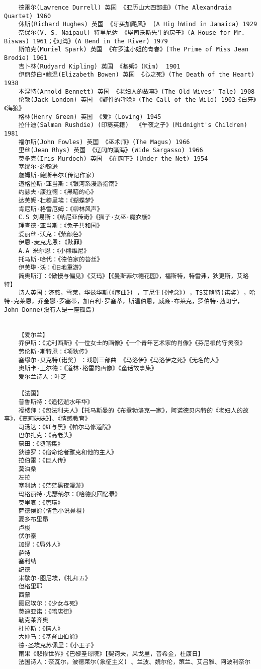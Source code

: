\documentclass[UTF8]{../RepresentationUniverse}
\begin{document}
\begin{lstlisting}
    德雷尔(Lawrence Durrell) 英国 《亚历山大四部曲》(The Alexandraia Quartet) 1960
    休斯(Richard Hughes) 英国 《牙买加飓风》 (A Hig hWind in Jamaica) 1929
    奈保尔(V. S. Naipaul) 特里尼达 《毕司沃斯先生的房子》(A House for Mr. Biswas) 1961；《河湾》(A Bend in the River) 1979
    斯帕克(Muriel Spark) 英国 《布罗迪小姐的青春》(The Prime of Miss Jean Brodie) 1961
    吉卜林(Rudyard Kipling) 英国 《基姆》(Kim)  1901
    伊丽莎白•鲍温(Elizabeth Bowen) 英国 《心之死》(The Death of the Heart) 1938
    本涅特(Arnold Bennett) 英国 《老妇人的故事》(The Old Wives' Tale) 1908
    伦敦(Jack London) 英国 《野性的呼唤》(The Call of the Wild) 1903《白牙》《海狼》
    格林(Henry Green) 英国 《爱》(Loving) 1945
    拉什迪(Salman Rushdie) (印裔英籍)  《午夜之子》(Midnight's Children) 1981
    福尔斯(John Fowles) 英国 《巫术师》(The Magus) 1966
    里丝(Jean Rhys) 英国 《辽阔的藻海》(Wide Sargasso) 1966
    莫多克(Iris Murdoch) 英国 《在网下》(Under the Net) 1954
    塞缪尔·约翰逊
    詹姆斯·鲍斯韦尔(传记作家) 
    道格拉斯·亚当斯：《银河系漫游指南》
    约瑟夫·康拉德：《黑暗的心》
    达芙妮·杜穆里埃：《蝴蝶梦》
    肯尼斯·格雷厄姆：《柳林风声》
    C.S 刘易斯：《纳尼亚传奇》《狮子·女巫·魔衣橱》
    理查德·亚当斯：《兔子共和国》
    爱丽丝·沃克：《紫颜色》
    伊恩·麦克尤恩:《赎罪》
    A.A 米尔恩：《小熊维尼》
    托马斯·哈代：《德伯家的苔丝》
    伊芙琳·沃：《旧地重游》
    简奥斯汀：《傲慢与偏见》《艾玛》【《曼斯菲尔德花园》，福斯特，特雷弗，狄更斯，艾略特】
    诗人英国：济慈，雪莱，华兹华斯(《序曲》) ，丁尼生(《悼念》) ，TS艾略特(诺奖) ，哈特·克莱恩，乔金娜·罗塞蒂，加百利·罗塞蒂，斯温伯恩，威廉·布莱克，罗伯特·勃朗宁，John Donne(没有人是一座孤岛) 
    
    
    【爱尔兰】
    乔伊斯：《尤利西斯》《一位女士的画像》《一个青年艺术家的肖像》《芬尼根的守灵夜》
    劳伦斯·斯特恩：《项狄传》
    塞缪尔·贝克特(诺奖) ：戏剧三部曲 《马洛伊》《马洛伊之死》《无名的人》
    奥斯卡·王尔德：《道林·格雷的画像》《童话故事集》
    爱尔兰诗人：叶芝

    【法国】
    普鲁斯特：《追忆逝水年华》
    福楼拜：《包法利夫人》【托马斯曼的《布登勃洛克一家》，阿诺德贝内特的《老妇人的故事》，《嘉莉妹妹》】、《情感教育》
    司汤达：《红与黑》《帕尔马修道院》
    巴尔扎克：《高老头》
    蒙田：《随笔集》
    狄德罗：《宿命论者雅克和他的主人》
    拉伯雷：《巨人传》
    莫泊桑
    左拉
    塞利纳：《茫茫黑夜漫游》
    玛格丽特·尤瑟纳尔：《哈德良回忆录》
    莫里哀：《唐璜》
    萨德侯爵(情色小说鼻祖) 
    夏多布里昂
    卢梭
    伏尔泰
    加缪：《局外人》
    萨特
    塞利纳
    纪德
    米歇尔·图尼埃，《礼拜五》
    但格里耶
    西蒙
    图尼埃尔：《少女与死》
    莫迪亚诺：《暗店街》
    勒克莱齐奥
    杜拉斯：《情人》
    大仲马：《基督山伯爵》
    德·圣埃克苏佩里：《小王子》
    雨果《悲惨世界》《巴黎圣母院》【契诃夫，果戈里，普希金，杜康日】
    法国诗人：奈瓦尔，波德莱尔(象征主义) 、兰波、魏尔伦，策兰、艾吕雅、阿波利奈尔
\end{lstlisting}
\end{document}
